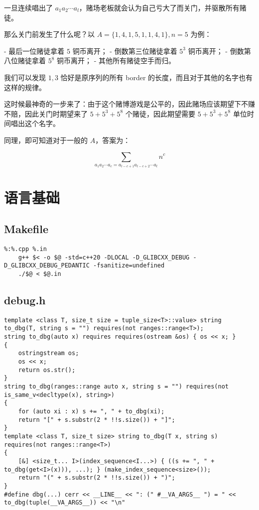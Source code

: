\documentclass[12pt]{ctexart}
\begin{document}
一旦连续唱出了 $a_1a_2\cdots a_l$，赌场老板就会认为自己亏大了而关门，并驱散所有赌徒。

那么关门前发生了什么呢？以 $A=\{1,4,1,5,1,1,4,1\},n=5$ 为例：

- 最后一位赌徒拿着 $5$ 铜币离开；
- 倒数第三位赌徒拿着 $5^3$ 铜币离开；
- 倒数第八位赌徒拿着 $5^8$ 铜币离开；
- 其他所有赌徒空手而归。

我们可以发现 $1,3$ 恰好是原序列的所有 border 的长度，而且对于其他的名字也有这样的规律。

这时候最神奇的一步来了：由于这个赌博游戏是公平的，因此赌场应该期望下不赚不赔，因此关门时期望来了 $5+5^3+5^8$ 个赌徒，因此期望需要 $5+5^3+5^8$ 单位时间唱出这个名字。

同理，即可知道对于一般的 $A$，答案为：

$$\sum\limits_{a_1a_2\cdots a_c=a_{l-c+1}a_{l-c+2}\cdots a_l} n^c$$


\newpage

\section{语言基础}

\subsection{Makefile}

\begin{lstlisting}
%:%.cpp %.in
	g++ $< -o $@ -std=c++20 -DLOCAL -D_GLIBCXX_DEBUG -D_GLIBCXX_DEBUG_PEDANTIC -fsanitize=undefined
	./$@ < $@.in
\end{lstlisting}
\subsection{debug.h}

\begin{lstlisting}
template <class T, size_t size = tuple_size<T>::value> string to_dbg(T, string s = "") requires(not ranges::range<T>);
string to_dbg(auto x) requires requires(ostream &os) { os << x; }
{
	ostringstream os;
	os << x;
	return os.str();
}
string to_dbg(ranges::range auto x, string s = "") requires(not is_same_v<decltype(x), string>)
{
	for (auto xi : x) s += ", " + to_dbg(xi);
	return "[" + s.substr(2 * !!s.size()) + "]";
}
template <class T, size_t size> string to_dbg(T x, string s) requires(not ranges::range<T>)
{
	[&] <size_t... I>(index_sequence<I...>) { ((s += ", " + to_dbg(get<I>(x))), ...); } (make_index_sequence<size>());
	return "(" + s.substr(2 * !!s.size()) + ")";
}
#define dbg(...) cerr << __LINE__ << ": (" #__VA_ARGS__ ") = " << to_dbg(tuple(__VA_ARGS__)) << "\n"

\end{lstlisting}
\end{document}
